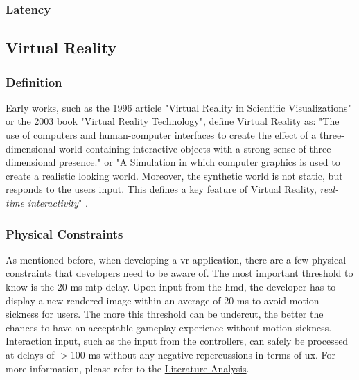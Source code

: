 \subsubsection{Latency}

\subsection{Virtual Reality}

\subsubsection{Definition}
Early works, such as the 1996 article "Virtual Reality in Scientific Visualizations"  or the 2003 book "Virtual Reality Technology", define Virtual Reality as: "The use of computers and human\hyp{}computer interfaces to create the effect of a three\hyp{}dimensional world containing interactive objects with a strong sense of three\hyp{}dimensional presence."\parencite{vrsv} or "A Simulation in which computer graphics is used to create a realistic looking world. Moreover, the synthetic world is not static, but responds to the users input. This defines a key feature of Virtual Reality, \textit{real\hyp{}time interactivity}" \parencite{vrtech}.

\subsubsection{Physical Constraints}

As mentioned before, when developing a \acrshort{vr} application, there are a few physical constraints that developers need to be aware of. The most important threshold to know is the 20 \acrshort{ms} \acrfull{mtp} delay. Upon input from the \acrfull{hmd}, the developer has to display a new rendered image within an average of 20 \acrshort{ms} to avoid motion sickness for users. The more this threshold can be undercut, the better the chances to have an acceptable gameplay experience without motion sickness. Interaction input, such as the input from the controllers, can safely be processed at delays of $>$100 \acrshort{ms} without any negative repercussions in terms of \acrfull{ux}. For more information, please refer to the \hyperref[sec:lit]{Literature Analysis}.